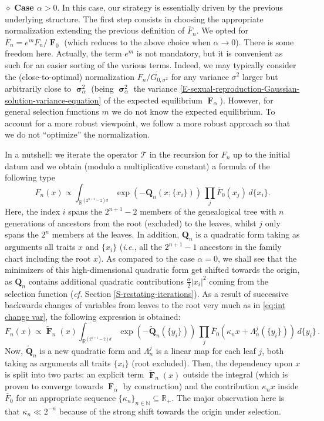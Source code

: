 \documentclass[reqno]{amsart}
\DeclareMathOperator{\bsigma}{\boldsymbol{\sigma}}
\DeclareMathOperator{\bF}{\boldsymbol{F}}
\numberwithin{equation}{section}
\begin{document}
{$\diamond$ {\bf Case $\alpha>0$}. In this case, our strategy is essentially driven by the previous underlying structure. The first step consists in choosing the appropriate normalization extending the previous definition of $\bar F_n$. We opted for $\bar F_n = e^m F_n / \bF_0$ (which reduces to the above choice when $\alpha\rightarrow 0$). There is some freedom here. Actually, the term $e^m$ is not mandatory, but it is convenient as such for an easier sorting of the various terms. Indeed, we may typically consider the (close-to-optimal) normalization $F_n/G_{0,\sigma^2}$ for any variance $\sigma^2$ larger but arbitrarily close to $\bsigma_\alpha^2$ (being $\bsigma_\alpha^2$ the variance \eqref{E-sexual-reproduction-Gaussian-solution-variance-equation} of the expected equilibrium $\bF_\alpha$). However, for general selection functions $m$ we do not know the expected equilibrium. To account for a more robust viewpoint, we  follow a more robust approach so that we do not ``optimize'' the normalization.


In a nutshell: we iterate the operator $\mathcal{T}$ in the recursion for $F_n$ up to the initial datum and we obtain (modulo a multiplicative constant) a formula of the following type
$$
F_n(x)\propto \int_{\mathbb{R}^{(2^{n+1}-2)d}} \exp(-\mathbf{Q}_n(x;\{x_i\}))\,\prod_j  \bar F_0(x_j)\, d\{x_i\} .
$$
Here, the index $i$ spans the $2^{n+1}-2$ members of the genealogical tree with $n$ generations of ancestors from the root (excluded) to the leaves, whilst $j$ only spans the $2^n$ members at the leaves. In addition, $\mathbf{Q}_n$ is a quadratic form taking as arguments all traits $x$ and $\{x_i\}$ ({\em i.e.}, all the $2^{n+1}-1$ ancestors in the family chart including the root $x$). As compared to the case $\alpha = 0$, we shall see that the minimizers of this high-dimensional quadratic form get shifted towards the origin, as $\mathbf{Q}_n$ contains additional quadratic contributions $ \frac{\alpha}{2} |x_i|^2$ coming from the selection function ({\em cf.} Section \ref{S-restating-iterations}). As a result of successive backwards changes of variables from leaves to the root very much as in \eqref{eq:int change var}, the following expression is obtained:
\begin{equation}\label{eq:iterations alpha>0}
F_n(x)\propto \widetilde{\bF}_n(x) \int_{\mathbb{R}^{(2^{n+1}-2)d}} \exp(-\widetilde{\mathbf{Q}}_n(\{y_i\}))\,\prod_j  \bar F_0(\kappa_n x+\Lambda_n^j(\{y_i\}))\, d\{y_i\}\,.
\end{equation}
Now, $\widetilde{\mathbf{Q}}_n$ is a new quadratic form and $\Lambda_n^j$ is a linear map for each leaf $j$, both taking as arguments all traits $\{x_i\}$ (root excluded). Then, the dependency upon $x$ is split into two parts: an explicit term $\widetilde{\bF}_n(x)$ outside the integral (which is proven to converge towards $\bF_\alpha$ by construction) and the contribution $\kappa_n x$ inside $\bar F_0$ for an appropriate sequence $\{\kappa_n\}_{n\in \mathbb{N}}\subseteq \mathbb{R}_+$. The major observation here is that $\kappa_n\ll 2^{-n}$ because of the strong shift towards the origin under selection.

}
\end{document}
